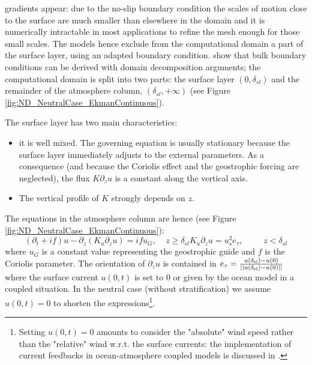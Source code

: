 gradients appear:
due to the no-slip boundary condition
the scales of motion close to the surface are much smaller than
elsewhere in the domain and it is numerically
intractable in most applications
to refine the mesh enough for those small scales.
The models hence exclude from the computational domain
a part of the surface layer, using an adapted boundary
condition.
\cite{mohammadi_rough_1998} show that bulk boundary
conditions can be derived with domain decomposition arguments;
the computational domain is split into two parts:
the surface layer $(0,\delta_{sl})$ and the remainder of
the atmosphere column, $(\delta_{sl}, +\infty)$
(see Figure \ref{fig:ND_NeutralCase_EkmanContinuous}).
%
\par
The surface layer has two main characteristics:
\begin{itemize}
	\item it is well mixed. The governing equation
		is usually stationary because the surface layer
		immediately adjusts to the external parameters.
		As a consequence (and because the Coriolis effect
		and the geostrophic forcing are neglected),
		the flux $K \partial_z u$
		is a constant along the vertical axis.
	\item The vertical profile of $K$ strongly depends 
		on $z$.
\end{itemize}
The equations in the atmosphere column are hence (see Figure
\ref{fig:ND_NeutralCase_EkmanContinuous}):
\begin{subequations}
	\label{eq:ND_NeutralCase_continuousModel}
	\begin{equation}
	\label{eq:ND_NeutralCase_EkmanEq}
  (\partial_t + if) u - \partial_z (K_u \partial_z u) = if u_G
		,~~~~~ z \geq \delta_{sl}
	\end{equation}
	\begin{equation}
	\label{eq:ND_NeutralCase_ConstantFlux}
	K_u \partial_z u
	= u_\star^2
	e_\tau, ~~~~~~~~~~~ z < \delta_{sl}
	\end{equation}
\end{subequations}
where $u_G$ is a constant value representing the geostrophic guide and
$f$ is the Coriolis parameter.
The orientation of $\partial_z u$ is contained in
$e_\tau = \frac{u(\delta_{\rm sl})-u(0)}
	{||u(\delta_{\rm sl})-u(0)||}$
where the surface current $u(0, t)$ is set to 0 or given by
the ocean model in a coupled situation.
In the neutral case (without stratification) we assume
$u(0,t)=0$ to shorten the
expressions\footnote{
Setting $u(0,t)=0$ amounts to consider the "absolute" wind speed
rather than the "relative" wind w.r.t. the surface currents:
the implementation of current feedbacks in ocean-atmosphere
coupled models is discussed in \cite{renault_implementation_2019}.
}.
